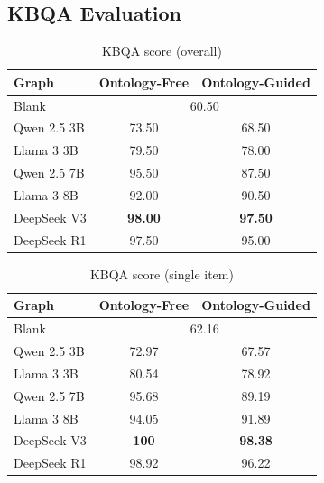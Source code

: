 \documentclass[a4, conference]{IEEEtran}
\begin{document}
\subsection{KBQA Evaluation}

\begin{table}[h]
    \centering
    \caption{KBQA score (overall)}
    \label{tab:qa_percent}
    \begin{tabular}{|l|c|c|}
        \hline
        Graph       & Ontology-Free               & Ontology-Guided \\
        \hline
        Blank       & \multicolumn{2}{|c|}{60.50}                   \\
        \hline
        Qwen 2.5 3B & 73.50                       & 68.50           \\
        \hline
        Llama 3 3B  & 79.50                       & 78.00           \\
        \hline
        Qwen 2.5 7B & 95.50                       & 87.50           \\
        \hline
        Llama 3 8B  & 92.00                       & 90.50           \\
        \hline
        DeepSeek V3 & \textbf{98.00}              & \textbf{97.50}  \\
        \hline
        DeepSeek R1 & 97.50                       & 95.00           \\
        \hline
    \end{tabular}
\end{table}

\begin{table}[h]
    \centering
    \caption{KBQA score (single item)}
    \label{tab:qa_percent_single}
    \begin{tabular}{|l|c|c|}
        \hline
        Graph       & Ontology-Free               & Ontology-Guided \\
        \hline
        Blank       & \multicolumn{2}{|c|}{62.16}                   \\
        \hline
        Qwen 2.5 3B & 72.97                       & 67.57           \\
        \hline
        Llama 3 3B  & 80.54                       & 78.92           \\
        \hline
        Qwen 2.5 7B & 95.68                       & 89.19           \\
        \hline
        Llama 3 8B  & 94.05                       & 91.89           \\
        \hline
        DeepSeek V3 & \textbf{100}                & \textbf{98.38}  \\
        \hline
        DeepSeek R1 & 98.92                       & 96.22           \\
        \hline
    \end{tabular}
\end{table}
\end{document}
